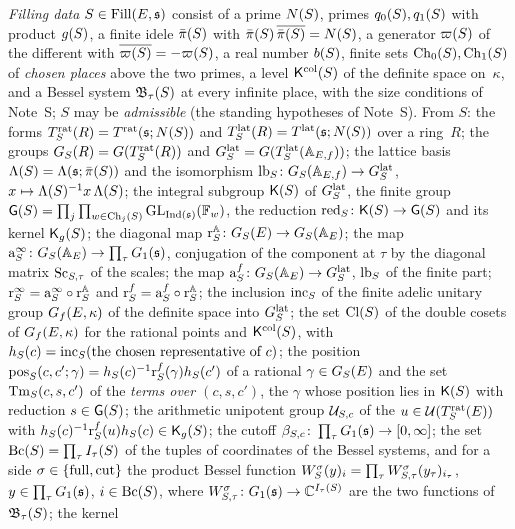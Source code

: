 \documentclass[11pt,a4paper]{article}
\newcommand{\F}{\mathbb{F}}
\theoremstyle{plainx}
\theoremstyle{uprightx}
\begin{document}
\emph{Filling data} $S\in\Fill{E}{\fs}$ consist of a prime $\NS{S}$, primes $\qS{S}{0},\qS{S}{1}$ with product
$\gS{S}$, a finite idele $\piS{S}$ with $\piS{S}\,\overline{\piS{S}}=\NS{S}$, a generator $\vpS{S}$ of the different
with $\overline{\vpS{S}}=-\vpS{S}$, a real number $\bS{S}$, finite sets $\ChS{S}{0},\ChS{S}{1}$ of \emph{chosen
places} above the two primes, a level $\KcolS{S}$ of the definite space on~$\kappa$, and a Bessel system
$\BsysS{S}{\tau}$ at every infinite place, with the size conditions of Note~S; $S$ may be \emph{admissible}
(the standing hypotheses of Note~S). From $S$: the forms $\Trat{S}{R}=\Trg{\fs}{\NS{S}}$ and
$\Tlat{S}{R}=\Tlatg{\fs}{\NS{S}}$ over a ring~$R$; the groups $\GS{S}{R}=\GT{\Trat{S}{R}}$ and
$\GFin{S}=\GT{\Tlat{S}{\AEf}}$; the lattice basis $\latB{S}=\blb{\fs}{\piS{S}}$ and the isomorphism
$\tolb{S}\colon\GS{S}{\AEf}\to\GFin{S}$, $x\mapsto\latB{S}^{-1}x\,\latB{S}$; the integral subgroup $\KS{S}$ of
$\GFin{S}$, the finite group $\GRes{S}=\prod_{j}\prod_{w\in\ChS{S}{j}}\GL_{\Ix{\fs}}(\F_w)$, the reduction
$\redS{S}\colon\KS{S}\to\GRes{S}$ and its kernel $\KgS{S}$; the diagonal map
$\radl{S}\colon\GS{S}{E}\to\GS{S}{\AdE}$; the map $\ainf{S}\colon\GS{S}{\AdE}\to\prod_\tau\Gone{\fs}$, conjugation
of the component at $\tau$ by the diagonal matrix $\bsGL{S}{\tau}$ of the scales; the map
$\afin{S}\colon\GS{S}{\AdE}\to\GFin{S}$, $\tolb{S}$ of the finite part; $\rinf{S}=\ainf{S}\circ\radl{S}$ and
$\rfin{S}=\afin{S}\circ\radl{S}$; the inclusion $\incH{S}$ of the finite adelic unitary group $\Gf{E}{\kappa}$ of the
definite space into $\GFin{S}$; the set $\Cl{S}$ of the double cosets of $\Gf{E}{\kappa}$ for the rational points and
$\KcolS{S}$, with $\hc{S}{c}=\incH{S}(\text{the chosen representative of }c)$; the position
$\pos{S}{c}{c'}{\gamma}=\hc{S}{c}^{-1}\rfin{S}(\gamma)\hc{S}{c'}$ of a rational $\gamma\in\GS{S}{E}$ and the set
$\terms{S}{c}{s}{c'}$ of the \emph{terms over $(c,s,c')$}, the $\gamma$ whose position lies in $\KS{S}$ with reduction
$s\in\GRes{S}$; the arithmetic unipotent group $\clU{S}{c}$ of the $u\in\UT{\Trat{S}{E}}$ with
$\hc{S}{c}^{-1}\rfin{S}(u)\hc{S}{c}\in\KgS{S}$; the cutoff $\cutoff{S}{c}\colon\prod_\tau\Gone{\fs}\to[0,\infty]$; the
set $\Bc{S}=\prod_\tau I_\tau(S)$ of the tuples of coordinates of the Bessel systems, and for a side
$\sigma\in\{\full,\cut\}$ the product Bessel function $\besfn{\sigma}{S}{y}{i}=\prod_\tau W^{\sigma}_{S,\tau}(y_\tau)_{i_\tau}$,
$y\in\prod_\tau\Gone{\fs}$, $i\in\Bc{S}$, where $W^{\sigma}_{S,\tau}\colon\Gone{\fs}\to\CC^{I_\tau(S)}$ are the two
functions of $\BsysS{S}{\tau}$; the kernel
\end{document}

